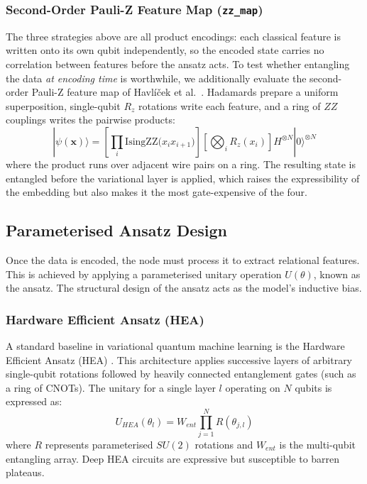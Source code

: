 \documentclass[12pt, a4paper, oneside]{report}
\begin{document}
\subsubsection{Second-Order Pauli-Z Feature Map (\texttt{zz\_map})}
\label{sec:enc_zz_map}
The three strategies above are all product encodings: each classical feature is written onto its own qubit independently, so the encoded state carries no correlation between features before the ansatz acts. To test whether entangling the data \textit{at encoding time} is worthwhile, we additionally evaluate the second-order Pauli-Z feature map of Havlíček et al.\ \cite{havlicek2019}. Hadamards prepare a uniform superposition, single-qubit $R_z$ rotations write each feature, and a ring of $ZZ$ couplings writes the pairwise products:
\begin{equation}
    |\psi(\mathbf{x})\rangle = \left[ \prod_{i} \text{IsingZZ}\big(x_i x_{i+1}\big) \right] \left[ \bigotimes_{i} R_z(x_i) \right] H^{\otimes N} |0\rangle^{\otimes N}
\end{equation}
where the product runs over adjacent wire pairs on a ring. The resulting state is entangled before the variational layer is applied, which raises the expressibility of the embedding but also makes it the most gate-expensive of the four.

\subsection{Parameterised Ansatz Design}
\label{sec:ansatz_design}
Once the data is encoded, the node must process it to extract relational features. This is achieved by applying a parameterised unitary operation $U(\theta)$, known as the ansatz. The structural design of the ansatz acts as the model's inductive bias.

\subsubsection{Hardware Efficient Ansatz (HEA)}
A standard baseline in variational quantum machine learning is the Hardware Efficient Ansatz (HEA) \cite{kandala2017}. This architecture applies successive layers of arbitrary single-qubit rotations followed by heavily connected entanglement gates (such as a ring of CNOTs). The unitary for a single layer $l$ operating on $N$ qubits is expressed as:
\begin{equation}
    U_{HEA}(\theta_l) = W_{ent} \prod_{j=1}^N R(\theta_{j,l})
\end{equation}
where $R$ represents parameterised $SU(2)$ rotations and $W_{ent}$ is the multi-qubit entangling array. Deep HEA circuits are expressive but susceptible to barren plateaus.
\end{document}
